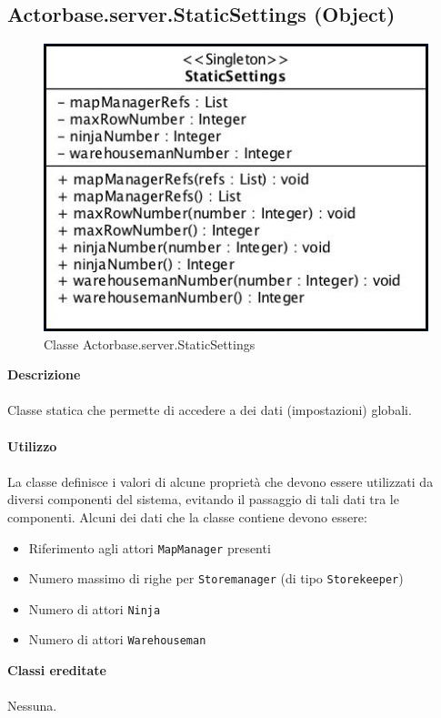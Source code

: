 \documentclass[a4paper]{article}
\begin{document}
		\subsection{Actorbase.server.StaticSettings (Object)}
		\begin{figure}[H]
			\centering
			\includegraphics[scale=0.5]{Server/staticSettingClass.jpg}
			\caption{Classe Actorbase.server.StaticSettings}
		\end{figure}
		\textbf{Descrizione}
			\\ \\
			Classe statica che permette di accedere a dei dati (impostazioni) globali.
			\\ \\
		\textbf{Utilizzo}
			\\ \\
			La classe definisce i valori di alcune proprietà che devono essere utilizzati da diversi componenti del sistema, evitando il passaggio di tali dati tra le componenti. Alcuni dei dati che la classe contiene devono essere:
			\begin{itemize}
				\item Riferimento agli attori \texttt{MapManager} presenti
				\item Numero massimo di righe per \texttt{Storemanager} (di tipo \texttt{Storekeeper})
				\item Numero di attori \texttt{Ninja}
				\item Numero di attori \texttt{Warehouseman}
			\end{itemize}
		\textbf{Classi ereditate}
			\\ \\
			Nessuna.
			\\ \\
\end{document}
